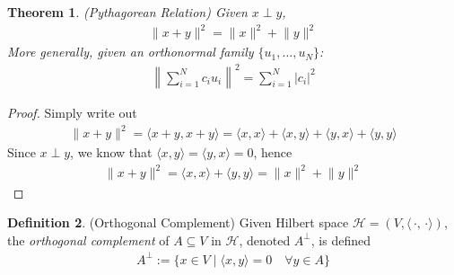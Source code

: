 \documentclass[12pt]{article}
\numberwithin{equation}{section} %
\theoremstyle{plain}
\newtheorem{thm}{Theorem}[section]
\theoremstyle{definition}
\newtheorem{defn}[thm]{Definition}
\theoremstyle{remark}
\newcommand{\calH}{\mathcal{H}}
\begin{document}
\begin{thm}
\label{pythag}
\emph{(Pythagorean Relation)} Given $x\perp y$,
\begin{align*}
    \lVert x + y\rVert^2 = \lVert x\rVert^2 + \lVert y \rVert^2
\end{align*}
More generally, given an orthonormal family $\{u_1,\ldots,u_N\}$:
\begin{align*}
  \left\lVert \sum_{i=1}^N c_i u_i \right\rVert^2
  = \sum_{i=1}^N |c_i|^2
\end{align*}
\end{thm}
\begin{proof}
Simply write out
\begin{align*}
  \lVert x + y\rVert^2 =
  \langle x + y, x + y\rangle
  =
  \langle x , x \rangle
  +
  \langle x , y \rangle
  +
  \langle y , x \rangle
  +
  \langle y , y \rangle
\end{align*}
Since $x\perp y$, we know that $\langle x,y \rangle = \langle y,x
\rangle =0$, hence
\begin{align*}
  \lVert x + y\rVert^2 =
  \langle x , x \rangle
  +
  \langle y , y \rangle
  =
  \lVert x\rVert^2 + \lVert y\rVert^2
\end{align*}
\end{proof}

\begin{defn}(Orthogonal Complement)
Given Hilbert space $\calH=(V,\langle\,\cdot,\,\cdot\rangle)$, the
\emph{orthogonal complement} of $A\subseteq V$ in $\calH$, denoted
$A^\perp$, is defined
\begin{align*}
  A^\perp :=
  \{
    x \in V \;|\; \langle x,y\rangle = 0
    \quad \forall y\in A
  \}
\end{align*}
\end{defn}

\end{document}
